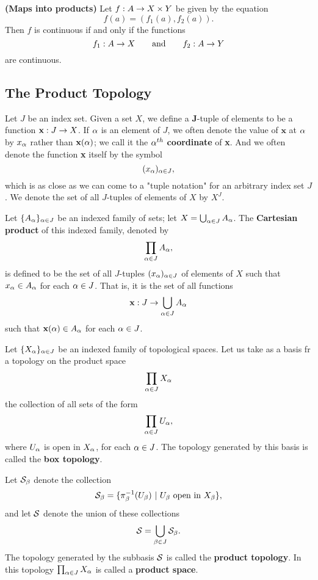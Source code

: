 \vs

\begin{thm}\textbf{(Maps into products)} Let $f:A\rightarrow X\times Y$ be given by the equation
\[f(a) = (f_1(a), f_2(a)).\]
Then $f$ is continuous if and only if the functions
\[f_1:A\rightarrow X\qquad\text{and}\qquad f_2:A\rightarrow Y\]
are continuous.
\end{thm}

\subsection{The Product Topology}\nl
\setcounter{section}{19}
\setcounter{thm}{0}

\vs

\dfn Let $J$ be an index set. Given a set $X$, we define a $\boldsymbol J$-tuple of elements to be a function $\textbf{x}:J \rightarrow X$. If $\alpha$ is an element of $J$, we often denote the value of $\textbf{x}$ at $\alpha$ by $x_\alpha$ rather than $\textbf{x}(\alpha)$; we call it the $\alpha^{th}$ \textbf{coordinate} of \textbf{x}. And we often denote the function \textbf{x} itself by the symbol
\[(x_\alpha)_{\alpha\in J},\]
which is as close as we can come to a "tuple notation" for an arbitrary index set $J$. We denote the set of all $J$-tuples of elements of $X$ by $X^J$.

\dfn Let $\{A_\alpha\}_{\alpha\in J}$ be an indexed family of sets; let $X = \bigcup_{\alpha\in J} A_\alpha$. The \textbf{Cartesian product} of this indexed family, denoted by
\[\prod_{\alpha\in J}A_\alpha,\]
is defined to be the set of all $J$-tuples $(x_\alpha)_{\alpha\in J}$ of elements of $X$ such that $x_\alpha \in A_\alpha$ for each $\alpha \in J$. That is, it is the set of all functions
\[\textbf{x}:J\rightarrow \bigcup_{\alpha\in J} A_\alpha\]
such that $\textbf{x}(\alpha)\in A_\alpha$ for each $\alpha\in J$.

\dfn Let $\{X_\alpha\}_{\alpha \in J}$ be an indexed family of topological spaces. Let us take as a basis fr a topology on the product space
\[\prod_{\alpha\in J}X_\alpha\]
the collection of all sets of the form
\[\prod_{\alpha\in J}U_\alpha,\]
where $U_\alpha$ is open in $X_\alpha$, for each $\alpha \in J$. The topology generated by this basis is called the \textbf{box topology}.

\dfn Let $\mathcal{S}_\beta$ denote the collection
\[\mathcal{S}_\beta = \{\pi_\beta^{-1}(U_\beta)\ |\ U_\beta \text{ open in } X_\beta\},\]
and let $\mathcal{S}$ denote the union of these collections
\[\mathcal{S} = \bigcup_{\beta\in J}\mathcal{S}_\beta.\]
The topology generated by the subbasis $\mathcal{S}$ is called the \textbf{product topology}. In this topology $\prod_{\alpha\in J}X_\alpha$ is called a \textbf{product space}.

